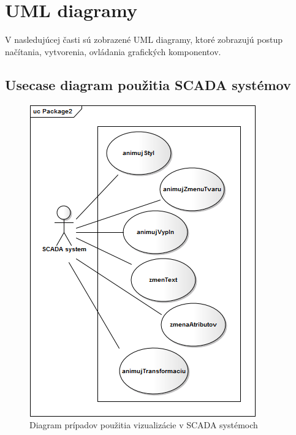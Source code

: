 \section{UML diagramy}
V nasledujúcej časti sú zobrazené UML diagramy, ktoré zobrazujú postup načítania, vytvorenia, ovládania grafických komponentov.
	\subsection{Usecase diagram použitia SCADA systémov}
	\begin{figure}[H]
		\centering
		\includegraphics[width=0.50\linewidth]{uml/usecase.png}
		\caption{Diagram prípadov použitia vizualizácie v SCADA systémoch}
		\label{fig:USECASE}
	\end{figure}

